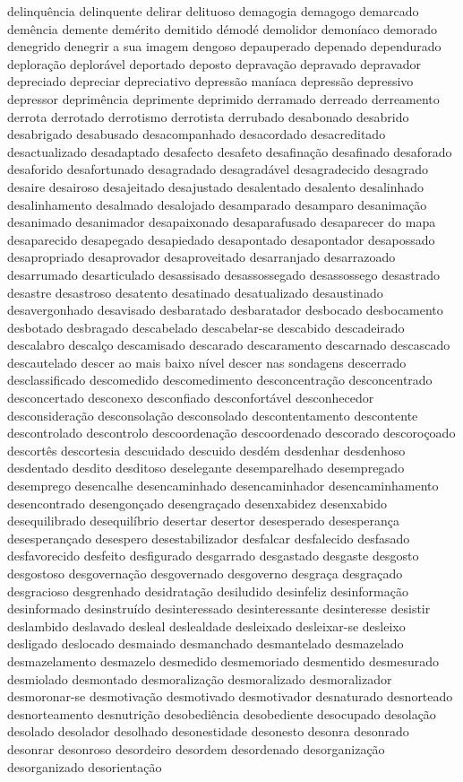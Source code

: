 delinqu\^{e}ncia delinquente delirar delituoso demagogia demagogo demarcado dem\^{e}ncia demente dem\'{e}rito demitido d\'{e}mod\'{e} demolidor demon\'{i}aco demorado denegrido denegrir a sua imagem dengoso depauperado depenado dependurado deplora\c{c}\~ao deplor\'{a}vel deportado deposto deprava\c{c}\~ao depravado depravador depreciado depreciar depreciativo depress\~ao man\'{i}aca depress\~ao depressivo depressor deprim\^{e}ncia deprimente deprimido derramado derreado derreamento derrota derrotado derrotismo derrotista derrubado desabonado desabrido desabrigado desabusado desacompanhado desacordado desacreditado desactualizado desadaptado desafecto desafeto desafina\c{c}\~ao desafinado desaforado desaforido desafortunado desagradado desagrad\'{a}vel desagradecido desagrado desaire desairoso desajeitado desajustado desalentado desalento desalinhado desalinhamento desalmado desalojado desamparado desamparo desanima\c{c}\~ao desanimado desanimador desapaixonado desaparafusado desaparecer do mapa desaparecido desapegado desapiedado desapontado desapontador desapossado desapropriado desaprovador desaproveitado desarranjado desarrazoado desarrumado desarticulado desassisado desassossegado desassossego desastrado desastre desastroso desatento desatinado desatualizado desaustinado desavergonhado desavisado desbaratado desbaratador desbocado desbocamento desbotado desbragado descabelado descabelar-se descabido descadeirado descalabro descal\c{c}o descamisado descarado descaramento descarnado descascado descautelado descer ao mais baixo n\'{i}vel descer nas sondagens descerrado desclassificado descomedido descomedimento desconcentra\c{c}\~ao desconcentrado desconcertado desconexo desconfiado desconfort\'{a}vel desconhecedor desconsidera\c{c}\~ao desconsola\c{c}\~ao desconsolado descontentamento descontente descontrolado descontrolo descoordena\c{c}\~ao descoordenado descorado descoro\c{c}oado descort\^{e}s descortesia descuidado descuido desd\'{e}m desdenhar desdenhoso desdentado desdito desditoso deselegante desemparelhado desempregado desemprego desencalhe desencaminhado desencaminhador desencaminhamento desencontrado desengon\c{c}ado desengra\c{c}ado desenxabidez desenxabido desequilibrado desequil\'{i}brio desertar desertor desesperado desesperan\c{c}a desesperan\c{c}ado desespero desestabilizador desfalcar desfalecido desfasado desfavorecido desfeito desfigurado desgarrado desgastado desgaste desgosto desgostoso desgoverna\c{c}\~ao desgovernado desgoverno desgra\c{c}a desgra\c{c}ado desgracioso desgrenhado desidrata\c{c}\~ao desiludido desinfeliz desinforma\c{c}\~ao desinformado desinstru\'{i}do desinteressado desinteressante desinteresse desistir deslambido deslavado desleal deslealdade desleixado desleixar-se desleixo desligado deslocado desmaiado desmanchado desmantelado desmazelado desmazelamento desmazelo desmedido desmemoriado desmentido desmesurado desmiolado desmontado desmoraliza\c{c}\~ao desmoralizado desmoralizador desmoronar-se desmotiva\c{c}\~ao desmotivado desmotivador desnaturado desnorteado desnorteamento desnutri\c{c}\~ao desobedi\^{e}ncia desobediente desocupado desola\c{c}\~ao desolado desolador desolhado desonestidade desonesto desonra desonrado desonrar desonroso desordeiro desordem desordenado desorganiza\c{c}\~ao desorganizado desorienta\c{c}\~ao 